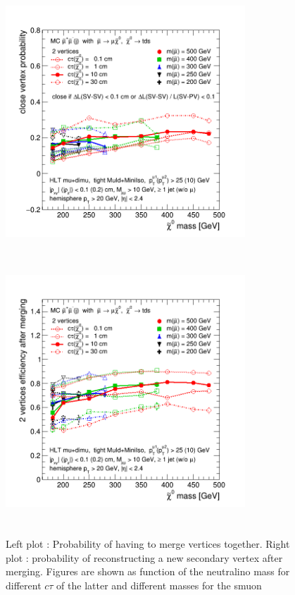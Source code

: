 \documentclass{cernatlasnote}
\begin{document}
        \begin{figure}[ht]
            \hspace{-1cm}
            \includegraphics[height=10cm, width=9cm, trim= 0cm 0cm 0cm 0.cm,clip]{images/Merging/close_2vtx_ctau_240322.png}\includegraphics[height=10cm, width=9cm, trim= 0cm 0cm 0cm 0.cm,clip]{images/Merging/merge_2vtx_ctau_240322.png}
            \caption{\label{fig:MERGE} Left plot : Probability of having to merge vertices together. Right plot : probability of reconstructing a new secondary vertex after merging. Figures are shown as function of the neutralino mass for different $c\tau$ of the latter and different masses for the smuon}
        \end{figure}
\end{document}
